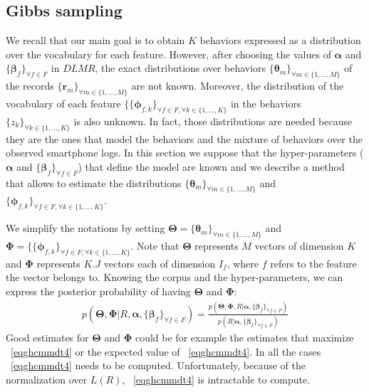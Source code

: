 \subsection{Gibbs sampling} \label{gibbs_sampling}
We recall that our main goal is to obtain $K$ behaviors expressed as a distribution over the vocabulary for each feature. However, after choosing the values of $\boldsymbol{\alpha}$ and $\{\boldsymbol{\beta }_{f}\}_{\forall f\in F}$ in $DLMR$, the exact distributions over behaviors $\{\boldsymbol{\theta}_{m}\}_{\forall m\in \{1,...,M\}}$ of the records $\{\mathbf{r}_{m}\}_{\forall m\in \{1,...,M\}}$ are not known. Moreover, the distribution of the vocabulary of each feature $\{\{\boldsymbol{\phi }_{f,k}\}_{\forall f \in F, \forall k\in\{1,...,K\}}$ in the behaviors $\{z_{k}\}_{ \forall k\in\{1,...,K\}}$ is also unknown. In fact, those distributions are needed because they are the ones that model the behaviors and the mixture of behaviors over the observed smartphone logs. In this section we suppose that the hyper-parameters ($\boldsymbol{\alpha}$ and $\{\boldsymbol{\beta }_{f}\}_{\forall f\in F}$) that define the model are known and we describe a method that allows to estimate the distributions $\{\boldsymbol{\theta}_{m}\}_{\forall m\in \{1,...,M\}}$ and $\{\boldsymbol{\phi }_{f,k}\}_{\forall f \in F, \forall k\in\{1,...,K\}}$. \par

We simplify the notations by setting $\boldsymbol{\Theta }=\{\boldsymbol{\theta}_{m}\}_{\forall m\in \{1,...,M\}}$ and $\boldsymbol{\Phi }=\{\{\boldsymbol{\phi }_{f,k}\}_{\forall f \in F, \forall k\in\{1,...,K\}}$. Note that $\boldsymbol{\Theta }$ represents $M$ vectors of dimension $K$ and $\boldsymbol{\Phi }$ represents $K.J$ vectors each of dimension $I_{f}$, where $f$ refers to the feature the vector belongs to. Knowing the corpus and the hyper-parameters, we can express the posterior probability of having $\boldsymbol{\Theta }$ and $\boldsymbol{\Phi }$:
\begin{equation}\label{eqghcmmdt4}
\begin{split} 
p(\boldsymbol{\Theta },\boldsymbol{\Phi }|R, \boldsymbol{\alpha},\{\boldsymbol{\beta }_{f}\}_{\forall f\in F})=\frac{p(\boldsymbol{\Theta },\boldsymbol{\Phi },R| \boldsymbol{\alpha},\{\boldsymbol{\beta }_{f}\}_{\forall f\in F})}{p(R| \boldsymbol{\alpha},\{\boldsymbol{\beta }_{f}\}_{\forall f\in F})}
\end{split} 
\end{equation}
Good estimates for $\boldsymbol{\Theta }$ and $\boldsymbol{\Phi }$ could be for example the estimates that maximize ~\eqref{eqghcmmdt4} or the expected value of ~\eqref{eqghcmmdt4}. In all the cases ~\eqref{eqghcmmdt4} needs to be computed. Unfortunately, because of the normalization over $L(R)$, ~\eqref{eqghcmmdt4} is intractable to compute. \par

